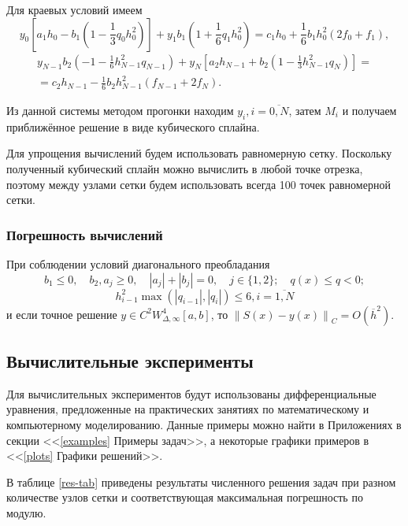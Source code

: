     Для краевых условий имеем
    \[
        y_0\left[ a_1 h_0 - b_1 \left( 1 - \frac{1}{3} q_0 h^2_0 \right) \right] + y_1 b_1 \left( 1 + \frac{1}{6} q_1 h_0^2 \right) = c_1 h_0 + \frac{1}{6} b_1 h_0^2 ( 2 f_0 + f_1 ),
    \]
    \begin{multline*}
        y_{N-1} b_2 \left( -1 - \frac{1}{6} h^2_{N-1} q_{N-1} \right) + y_N \left[ a_2 h_{N-1} + b_2 \left( 1 - \frac{1}{3} h^2_{N-1} q_N \right) \right] = \\ = c_2 h_{N-1} - \frac{1}{6} b_2 h^2_{N-1} (f_{N-1} + 2 f_N).
    \end{multline*}

    Из данной системы методом прогонки находим \( y_i, i=\overline{0,N} \), затем \( M_i \) и получаем приближённое решение в виде кубического сплайна.

    Для упрощения вычислений будем использовать равномерную сетку. Поскольку полученный кубический сплайн можно вычислить в любой точке отрезка, поэтому между узлами сетки будем использовать всегда 100 точек равномерной сетки.

    \subsubsection{Погрешность вычислений}
    При соблюдении условий диагонального преобладания
    \[
        b_1 \leq 0, \quad b_2, a_j \geq 0, \quad |a_j| + |b_j| = 0, \quad j\in\{1,2\}; \quad q(x) \leq q < 0;
    \]
    \[
        h^2_{i-1} \max(|q_{i-1}|, |q_i|) \leq 6, i = \overline{1,N}
    \]
    и если точное решение \( y \in C^2 W^4_{\Delta, \infty} [a, b] \), то \( \left\| S(x) - y(x) \right\|_C = O\left( \overline{h}^2 \right) \).

\subsection{Вычислительные эксперименты}
Для вычислительных экспериментов будут использованы дифференциальные уравнения, предложенные на практических занятиях по математическому и компьютерному моделированию. Данные примеры можно найти в Приложениях в секции <<\ref{examples} Примеры задач>>, а некоторые графики примеров в <<\ref{plots} Графики решений>>.

В таблице \ref{res-tab} приведены результаты численного решения задач при разном количестве узлов сетки и соответствующая максимальная погрешность по модулю.

